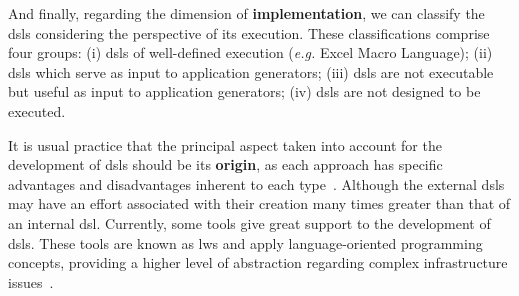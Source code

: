 And finally, regarding the dimension of \textbf{implementation}, we can classify the \acp{dsl} considering the perspective of its execution.
These classifications comprise four groups:
(i) \acp{dsl} of well-defined execution (\textit{e.g.} Excel Macro Language);
(ii) \acp{dsl} which serve as input to application generators;
(iii) \acp{dsl} are not executable but useful as input to application generators;
(iv) \acp{dsl} are not designed to be executed.



It is usual practice that the principal aspect taken into account for the development of \acp{dsl} should be its \textbf{origin}, as each approach has specific advantages and disadvantages inherent to each type~\cite{Fowler:2010}.
Although the external \acp{dsl} may have an effort associated with their creation many times greater than that of an internal \ac{dsl}. 
Currently, some tools give great support to the development of \acp{dsl}.
These tools are known as \acp{lw} and apply language-oriented programming concepts, providing a higher level of abstraction regarding complex infrastructure issues~\cite{Fowler:2005}.

